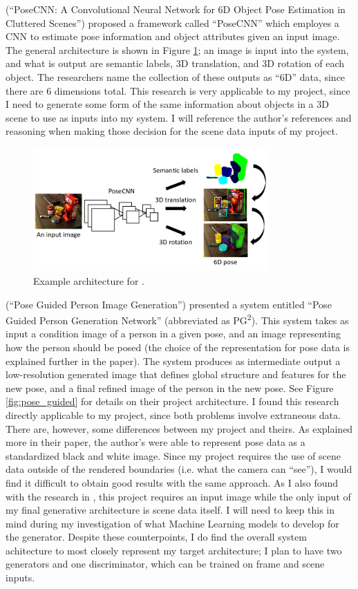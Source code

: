 \documentclass[conference]{IEEEtran}
\begin{document}
\cite{ref:posecnn} (``PoseCNN: A Convolutional Neural Network for 6D Object Pose Estimation in
Cluttered Scenes'') proposed a framework called ``PoseCNN'' which
employes a CNN to estimate pose information and object attributes given an input
image. The general architecture is shown in Figure \ref{fig:posecnn}; an image
is input into the system, and what is output are semantic labels, 3D
translation, and 3D rotation of each object. The researchers name the collection
of these outputs as ``6D'' data, since there are 6 dimensions total. This
research is very applicable to my project, since I need to generate some form of
the same information about objects in a 3D scene to use as inputs into my
system. I will reference the author's references and reasoning when making those
decision for the scene data inputs of my project.

\begin{figure}[htbp]
\centerline{\includegraphics[width=9cm]{posecnn.png}}
\caption{Example architecture for \cite{ref:posecnn}.}
\label{fig:posecnn}
\end{figure}

\cite{ref:pose_guided} (``Pose Guided Person Image Generation'')
presented a system entitled
``Pose Guided Person Generation Network'' (abbreviated as
PG\textsuperscript{2}). This system takes as input a condition image
of a person in a given pose, and an image representing how the person should be
posed (the choice of the representation for pose data is explained further in the
paper). The system produces as intermediate output a low-resolution generated
image that defines global structure and features for the new pose, and a final refined
image of the person in the new pose. See Figure \ref{fig:pose_guided} for
details on their project architecture. I found this research directly applicable
to my project, since both problems involve extraneous data. There are, however,
some differences between my project and theirs. As explained more in their
paper, the author's were able to represent pose data as a standardized black and white image.
Since my project requires the use of scene data outside of the rendered
boundaries (i.e. what the camera can ``see''), I would find it difficult to
obtain good results with the same approach. As I also found with the research in
\cite{ref:spatiotemporal}, this project requires an input image while the only
input of my final generative architecture is scene data itself. I will need to
keep this in mind during my investigation of what Machine Learning models to
develop for the generator. Despite these counterpoints, I do find the overall
system achitecture to most closely represent my target architecture; I plan to
have two generators and one discriminator, which can be trained on frame and
scene inputs.
\end{document}

